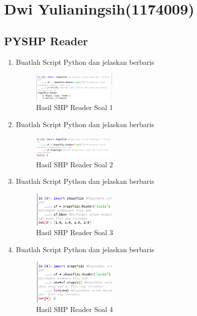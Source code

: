 \section{Dwi Yulianingsih(1174009)}
\subsection{PYSHP Reader}
\begin{enumerate}
    \item Buatlah Script Python dan jelaskan berbaris
    
    \hfill\break
    \begin{figure}[H]
		\includegraphics[width=4cm]{figures/1174009/3/1.png}
		\centering
		\caption{Hasil SHP Reader Soal 1}
    \end{figure}
    
    \item Buatlah Script Python dan jelaskan berbaris
    
    \hfill\break
    \begin{figure}[H]
		\includegraphics[width=4cm]{figures/1174009/3/2.png}
		\centering
		\caption{Hasil SHP Reader Soal 2}
    \end{figure}
    
    \item Buatlah Script Python dan jelaskan berbaris
    
    \hfill\break
    \begin{figure}[H]
		\includegraphics[width=4cm]{figures/1174009/3/3.png}
		\centering
		\caption{Hasil SHP Reader Soal 3}
    \end{figure}
    
    \item Buatlah Script Python dan jelaskan berbaris
    
    \hfill\break
    \begin{figure}[H]
		\includegraphics[width=4cm]{figures/1174009/3/4.png}
		\centering
		\caption{Hasil SHP Reader Soal 4}
    \end{figure}
    

\end{enumerate}
